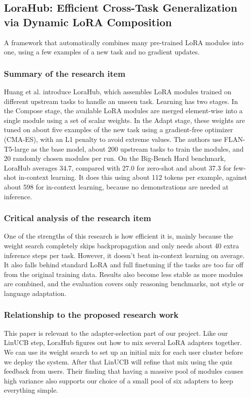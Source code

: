 \documentclass{FastFyp}
\begin{document}
\subsection{LoraHub: Efficient Cross-Task Generalization via Dynamic LoRA Composition}
A framework that automatically combines many pre-trained LoRA modules into one, using a few examples of a new task and no gradient updates.
 \subsubsection{Summary of the research item}
    Huang et al. \cite{huang2024lorahub} introduce LoraHub, which assembles LoRA modules trained on different upstream tasks to handle an unseen task. Learning has two stages. In the Compose stage, the available LoRA modules are merged element-wise into a single module using a set of scalar weights. In the Adapt stage, these weights are tuned on about five examples of the new task using a gradient-free optimizer (CMA-ES), with an L1 penalty to avoid extreme values. The authors use FLAN-T5-large as the base model, about 200 upstream tasks to train the modules, and 20 randomly chosen modules per run. On the Big-Bench Hard benchmark, LoraHub averages 34.7, compared with 27.0 for zero-shot and about 37.3 for few-shot in-context learning. It does this using about 112 tokens per example, against about 598 for in-context learning, because no demonstrations are needed at inference.

\subsubsection{Critical analysis of the research item}
One of the strengths of this research is how efficient it is, mainly because the weight search completely skips backpropagation and only needs about 40 extra inference steps per task. However, it doesn't beat in-context learning on average. It also falls behind standard LoRA and full finetuning if the tasks are too far off from the original training data. Results also become less stable as more modules are combined, and the evaluation covers only reasoning benchmarks, not style or language adaptation.

\subsubsection{Relationship to the proposed research work}
 This paper is relevant to the adapter-selection part of our project. Like our LinUCB step, LoraHub figures out how to mix several LoRA adapters together. We can use its weight search to set up an initial mix for each user cluster before we deploy the system. After that LinUCB will refine that mix using the quiz feedback from users. Their finding that having a massive pool of modules causes high variance also supports our choice of a small pool of six adapters to keep everything simple.
\end{document}
